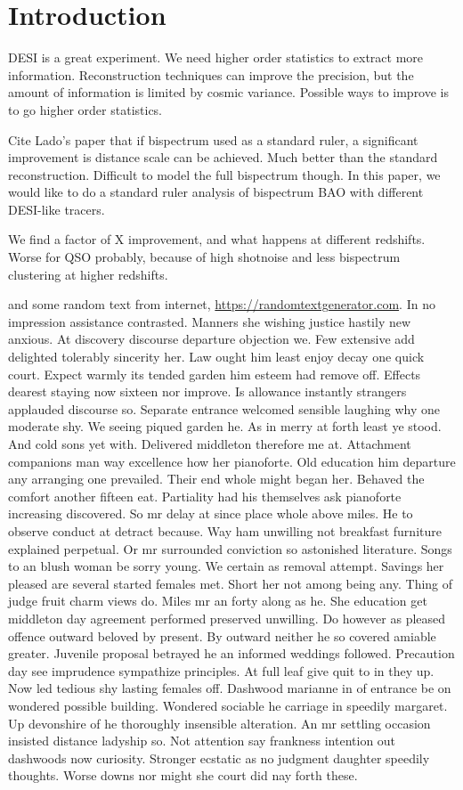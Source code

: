 \section{Introduction}
\label{sec:introduction}

DESI is a great experiment. We need higher order statistics to extract more information. Reconstruction techniques can improve the precision, but the amount of information is limited by cosmic variance. Possible ways to improve is to go higher order statistics. 

Cite Lado's paper that if bispectrum used as a standard ruler, a significant improvement is distance scale can be achieved. Much better than the standard reconstruction. Difficult to model the full bispectrum though. In this paper, we would like to do a standard ruler analysis of bispectrum BAO with different DESI-like tracers. 

We find a factor of X improvement, and what happens at different redshifts. Worse for QSO probably, because of high shotnoise and less bispectrum clustering at higher redshifts. 


and some random text from internet, \url{https://randomtextgenerator.com}. In no impression assistance contrasted. Manners she wishing justice hastily new anxious. At discovery discourse departure objection we. Few extensive add delighted tolerably sincerity her. Law ought him least enjoy decay one quick court. Expect warmly its tended garden him esteem had remove off. Effects dearest staying now sixteen nor improve.  Is allowance instantly strangers applauded discourse so. Separate entrance welcomed sensible laughing why one moderate shy. We seeing piqued garden he. As in merry at forth least ye stood. And cold sons yet with. Delivered middleton therefore me at. Attachment companions man way excellence how her pianoforte.  Old education him departure any arranging one prevailed. Their end whole might began her. Behaved the comfort another fifteen eat. Partiality had his themselves ask pianoforte increasing discovered. So mr delay at since place whole above miles. He to observe conduct at detract because. Way ham unwilling not breakfast furniture explained perpetual. Or mr surrounded conviction so astonished literature. Songs to an blush woman be sorry young. We certain as removal attempt. Savings her pleased are several started females met. Short her not among being any. Thing of judge fruit charm views do. Miles mr an forty along as he. She education get middleton day agreement performed preserved unwilling. Do however as pleased offence outward beloved by present. By outward neither he so covered amiable greater. Juvenile proposal betrayed he an informed weddings followed. Precaution day see imprudence sympathize principles. At full leaf give quit to in they up. Now led tedious shy lasting females off. Dashwood marianne in of entrance be on wondered possible building. Wondered sociable he carriage in speedily margaret. Up devonshire of he thoroughly insensible alteration. An mr settling occasion insisted distance ladyship so. Not attention say frankness intention out dashwoods now curiosity. Stronger ecstatic as no judgment daughter speedily thoughts. Worse downs nor might she court did nay forth these.  

